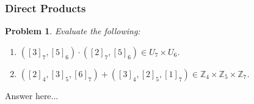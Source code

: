 \documentclass[12pt]{article}
\newtheorem{problem}{Problem}
\numberwithin{problem}{section} %
\theoremstyle{remark}  %
\newenvironment{answer}
    {\begin{adjustwidth}{0pt}{0pt}}
    {\end{adjustwidth}}
\begin{document}
\subsubsection{Direct Products}
\setcounter{problem}{56}
    \begin{problem}
        Evaluate the following:
        \begin{enumerate}[label=(\alph*)]
            \item $([3]_7,[5]_6) \cdot ([2]_7, [5]_6) \in U_7\times U_6$.
            \item $([2]_4, [3]_5, [6]_7) + ([3]_4, [2]_5, [1]_7) \in \mathbb{Z}_4 \times \mathbb{Z}_5 \times \mathbb{Z}_7$.
        \end{enumerate}
    \end{problem}
    \begin{answer}
        Answer here...
    \end{answer}
\end{document}
